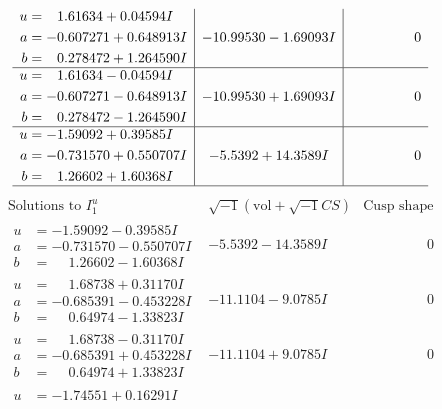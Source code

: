 \documentclass[1p]{elsarticle_modified}
\theoremstyle{definition}
\newcommand{\I}{\sqrt{-1}}
\begin{document}
$$\begin{array}{c|c|c}
\begin{aligned}
u &= \phantom{-}1.61634 + 0.04594 I \\
a &= -0.607271 + 0.648913 I \\
b &= \phantom{-}0.278472 + 1.264590 I\end{aligned}
 & -10.99530 - 1.69093 I & \phantom{-0.000000 } 0 \\ \hline\begin{aligned}
u &= \phantom{-}1.61634 - 0.04594 I \\
a &= -0.607271 - 0.648913 I \\
b &= \phantom{-}0.278472 - 1.264590 I\end{aligned}
 & -10.99530 + 1.69093 I & \phantom{-0.000000 } 0 \\ \hline\begin{aligned}
u &= -1.59092 + 0.39585 I \\
a &= -0.731570 + 0.550707 I \\
b &= \phantom{-}1.26602 + 1.60368 I\end{aligned}
 & -5.5392 + 14.3589 I & \phantom{-0.000000 } 0\\
 \hline 
 \end{array}$$\newpage$$\begin{array}{c|c|c}  
\text{Solutions to }I^u_{1}& \I (\text{vol} + \sqrt{-1}CS) & \text{Cusp shape}\\
 \hline 
\begin{aligned}
u &= -1.59092 - 0.39585 I \\
a &= -0.731570 - 0.550707 I \\
b &= \phantom{-}1.26602 - 1.60368 I\end{aligned}
 & -5.5392 - 14.3589 I & \phantom{-0.000000 } 0 \\ \hline\begin{aligned}
u &= \phantom{-}1.68738 + 0.31170 I \\
a &= -0.685391 - 0.453228 I \\
b &= \phantom{-}0.64974 - 1.33823 I\end{aligned}
 & -11.1104 - 9.0785 I & \phantom{-0.000000 } 0 \\ \hline\begin{aligned}
u &= \phantom{-}1.68738 - 0.31170 I \\
a &= -0.685391 + 0.453228 I \\
b &= \phantom{-}0.64974 + 1.33823 I\end{aligned}
 & -11.1104 + 9.0785 I & \phantom{-0.000000 } 0 \\ \hline\begin{aligned}
u &= -1.74551 + 0.16291 I \\

\end{aligned}
\end{array}$$
\end{document}
